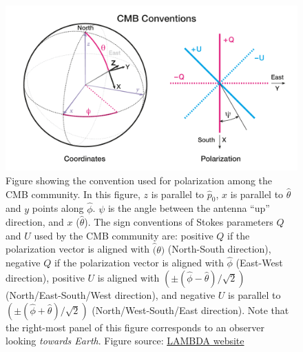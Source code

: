 \documentclass[a4paper,fleqn]{cas-dc}\sloppy
\begin{document}
\begin{figure}
	\centering
	\includegraphics[width=1\linewidth]{figures/cmb_coord_convention}
	\caption{Figure showing the convention used for polarization among the CMB community. In this figure, $z$ is parallel to $\hat{p}_0$, $x$ is parallel to $\hat{\theta}$ and $y$ points along $\hat{\phi}$. $\psi$ is the angle between the antenna ``up'' direction, and $x$ ($\hat{\theta}$). The sign conventions of Stokes parameters $Q$ and $U$ used by the CMB community are: positive $Q$ if the polarization vector is aligned with $\hat(\theta)$ (North-South direction), negative $Q$ if the polarization vector is aligned with $\hat{\phi}$ (East-West direction), positive $U$ is aligned with $(\pm(\hat{\phi} - \hat{\theta})/\sqrt{2} )$ (North/East-South/West direction), and negative $U$ is parallel to $(\pm(\hat{\phi} + \hat{\theta})/\sqrt{2} )$ (North/West-South/East direction). Note that the right-most panel of this figure corresponds to an observer looking \textsl{towards Earth}. Figure source: \href{https://lambda.gsfc.nasa.gov/product/about/pol_convention.cfm}{LAMBDA website}}
	\label{fig::cmbcoordconvention}
\end{figure}
%
%
%
\end{document}
